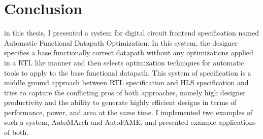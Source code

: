 \section{Conclusion}
in this thesis, I presented a system for digital circuit frontend specification named Automatic Functional Datapath Optimization. In this system, the designer specifies a base functionally correct datapath without any optimizations applied in a RTL like manner and then selects optimization techniques for automatic tools to apply to the base functional datapath. This system of specification is a middle ground approach between RTL specification and HLS specification and tries to capture the conflicting pros of both approaches, namely high designer productivity and the ability to generate highly efficient designs in terms of performance, power, and area at the same time. I implemented two examples of such a system, AutoMArch and AutoFAME, and presented example applications of both.
